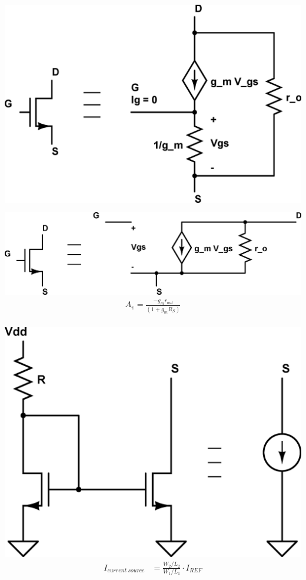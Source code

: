 \documentclass[10pt,letterpaper,english]{article}
\begin{document}
\begin{multicols}{2}
\includegraphics[scale=0.24]{mosfet-t-model.eps}
\begin{align*}
\tag*{Mosfet T-model}\\
\end{align*}
\includegraphics[scale=0.4]{mosfet-hybrid-pi.eps}
\vspace{2mm}
\begin{align*}
A_v = \frac{-g_mr_{out}}{(1 + g_mR_S)} \tag*{Mosfet hybrid pi model}\\
\end{align*}
\end{multicols}

\begin{multicols}{2}
\includegraphics[scale=0.2]{mosfet-current-mirror.eps}
\begin{align*}
I_{current\ source}&= \frac{W_2/L_2}{W_1/L_1}\cdot I_{REF} \tag*{MOSFET current mirror circuit}\\
\end{align*}
\end{multicols}
\end{document}
